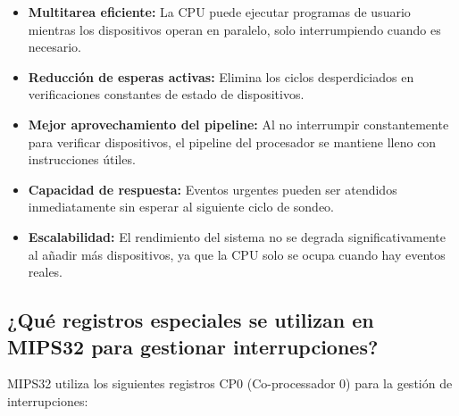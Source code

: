 \documentclass[12pt]{article}
\begin{document}
\begin{itemize}
	\item \textbf{Multitarea eficiente:} La CPU puede ejecutar programas de usuario mientras los dispositivos operan en paralelo, solo interrumpiendo cuando es necesario.
	
	\item \textbf{Reducción de esperas activas:} Elimina los ciclos desperdiciados en verificaciones constantes de estado de dispositivos.
	
	\item \textbf{Mejor aprovechamiento del pipeline:} Al no interrumpir constantemente para verificar dispositivos, el pipeline del procesador se mantiene lleno con instrucciones útiles.
	
	\item \textbf{Capacidad de respuesta:} Eventos urgentes pueden ser atendidos inmediatamente sin esperar al siguiente ciclo de sondeo.
	
	\item \textbf{Escalabilidad:} El rendimiento del sistema no se degrada significativamente al añadir más dispositivos, ya que la CPU solo se ocupa cuando hay eventos reales.
\end{itemize}

\subsection{¿Qué registros especiales se utilizan en MIPS32 para gestionar interrupciones?}

MIPS32 utiliza los siguientes registros CP0 (Co-processador 0) para la gestión de interrupciones:
\end{document}
